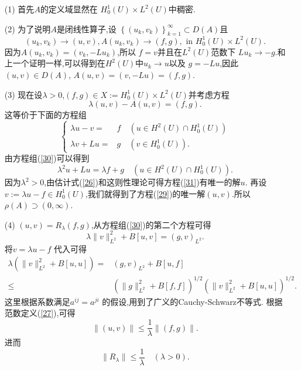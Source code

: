 \begin{enumerate}
  \item [(1)] 首先$A$的定义域显然在 $H_0^{1}(U)\times L^2(U)$中稠密.
  \item [(2)] 为了说明$A$是闭线性算子,设 $\left\{(u_k,v_k)\right\} _{k=1}^{\infty}\subset D(A)$且
    \[
      (u_k,v_k)\to (u,v), A(u_k,v_k)\to (f,g), \text{ in } H_0^{1}(U)\times L^2(U).
    \] 
    因为$A(u_k,v_k)=(v_k,-Lu_k)$,所以 $f=v$并且在$L^2(U)$范数下 $Lu_k\to -g$.和上一个证明一样,可以得到在$H^2(U)$中$u_k\to u$以及 $g=-Lu$,因此 $(u,v)\in D(A)$, $A(u,v)=(v,-Lu)=(f,g)$.
  \item [(3)] 现在设$\lambda>0$,$(f,g)\in X:=H_0^{1}(U)\times L^2(U)$并考虑方程
      \begin{equation}\label{29}
      \lambda(u,v)-A(u,v)=(f,g).
    \end{equation}
    这等价于下面的方程组
    \begin{equation}\label{30}
      \left\{
	\begin{aligned}
	  \lambda u-v=&f \quad \left( u\in H^2(U)\cap H_0^{1}(U) \right) \\
	  \lambda v +Lu=&g\quad \left(v\in H_0^{1}(U)  \right) .
	\end{aligned}
	\right.
    \end{equation}
    由方程组(\ref{30})可以得到
    \begin{equation}\label{31}
      \lambda^2u+Lu=\lambda f+g \quad \left( u\in H^2(U)\cap H_0^{1}(U) \right) .
    \end{equation}
    因为$\lambda^2>0$,由估计式(\ref{26})和这则性理论可得方程(\ref{31})有唯一的解$u$. 再设 $v:=\lambda u -f\in H_0^{1}(U)$,我们就得到了方程(\ref{29})的唯一解$(u,v)$.所以$\rho(A)\supset (0,\infty)$.
  \item [(4)] $(u,v)=R_\lambda(f,g)$,从方程组(\ref{30})的第二个方程可得
    \[
      \lambda \|v\|^2_{L^2}+B[u,v]=(g,v)_{L^2}.
    \]  将$v=\lambda u-f$ 代入可得
    \begin{align*}
      \lambda \left( \|v\|^2_{L^2}+B[u,u] \right) =& (g,v)_{L^2}+B[u,f]\\
      \le & \left( \|g\|_{L^2}^2+B[f,f] \right) ^{1 /2}\left( \|v\|^2_{L^2}+B[u,u] \right) ^{1 /2}  
    .\end{align*}
    这里根据系数满足$a^{ij}=a^{ji}$ 的假设,用到了广义的Cauchy-Schwarz不等式.
    根据范数定义(\ref{27}),可得
    \[
      \|(u,v)\|\le \frac{1}{\lambda}\|(f,g)\|.
    \] 进而
    \[
      \|R_\lambda\|\le \frac{1}{\lambda}\quad (\lambda>0).
    \] 
\end{enumerate}

